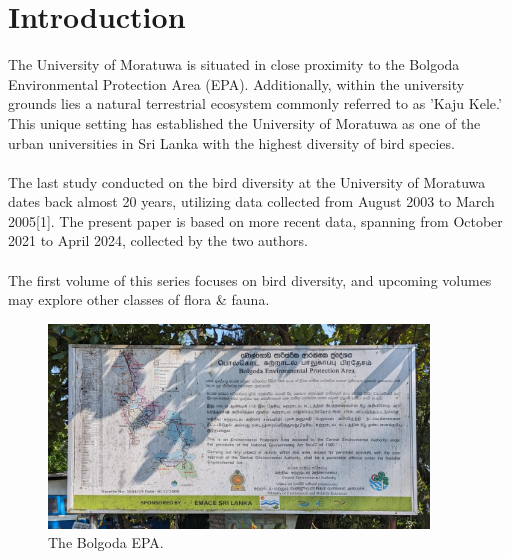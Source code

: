 \chapter{Introduction}
\label{cp:introduction}
The University of Moratuwa is situated in close proximity to the Bolgoda Environmental Protection Area (EPA). Additionally, within the university grounds lies a natural terrestrial ecosystem commonly referred to as 'Kaju Kele.' This unique setting has established the University of Moratuwa as one of the urban universities in Sri Lanka with the highest diversity of bird species.
\\\\
The last study conducted on the bird diversity at the University of Moratuwa dates back almost 20 years, utilizing data collected from August 2003 to March 2005[1]. The present paper is based on more recent data, spanning from October 2021 to April 2024, collected by the two authors.
\\\\
The first volume of this series focuses on bird diversity, and upcoming volumes may explore other classes of flora \& fauna.
\begin{figure}[!htpb]
    \centering
    \includegraphics[width=0.9\textwidth]{Figures/epa.jpg}
    \caption[]{The Bolgoda EPA.}
    \label{fig:figure-01}
\end{figure}


